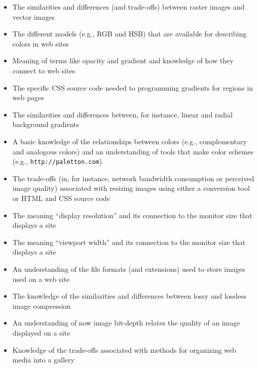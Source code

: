 \documentclass[11pt]{article}
\newcommand{\program}[1]{\lstinline{#1}}
\begin{document}
\begin{itemize}

  \itemsep 0.05in

  \item The similarities and differences (and trade-offs) between raster images
    and vector images

  \item The different models (e.g., RGB and HSB) that are available for
    describing colors in web sites

  \item Meaning of terms like opacity and gradient and knowledge of how
    they connect to web sites

  \item The specific CSS source code needed to programming gradients for regions
    in web pages

  \item The similarities and differences between, for instance, linear and
    radial background gradients

  \item A basic knowledge of the relationships between colors (e.g.,
    complementary and analogous colors) and an understanding of tools that make
    color schemes (e.g., \program{http://paletton.com})

  \item The trade-offs (in, for instance, network bandwidth consumption or
    perceived image quality) associated with resizing images using either a
    conversion tool or HTML and CSS source code

  \item The meaning ``display resolution'' and its connection to the monitor
    size that displays a site

  \item The meaning ``viewport width'' and its connection to the monitor
    size that displays a site

  \item An understanding of the file formats (and extensions) used to store
    images used on a web site

  \item The knowledge of the similarities and differences between lossy and
    lossless image compression

  \item An understanding of now image bit-depth relates the quality of an image
    displayed on a site

  \item Knowledge of the trade-offs associated with methods for organizing web
    media into a gallery

\end{itemize}
\end{document}
